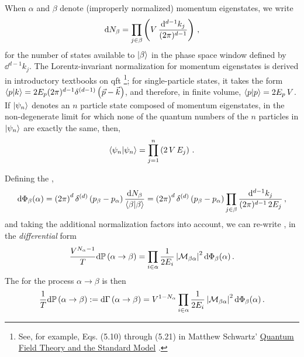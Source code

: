 When \(\alpha\) and \(\beta\) denote (improperly normalized) momentum eigenstates, we write
\begin{align}
    \dd N_\beta = \prod_{j \in \beta}\left(V \, \frac{\dd^{d-1} k_j}{(2\pi)^{d-1}}\right)
    \,,
\end{align}
for the number of states available to \(\ket{\beta}\) in the phase space window defined by \(\dd^{d-1} k_j\).
%
The Lorentz-invariant normalization for momentum eigenstates is derived in introductory textbooks on \gls{qft}%
\footnote{
    See, for example, Eqs. (5.10) through (5.21) in Matthew Schwartz' \underline{Quantum Field Theory and the Standard Model} \cite{Schwartz:2014sze}.
};
%
for single-particle states, it takes the form \(\braket{p}{k} = 2 E_p (2\pi)^{d-1} \delta^{(d-1)}\left(\vec{p} - \vec{k}\right)\), and therefore, in finite volume, \(\braket{p}{p} = 2 E_p \, V\).
%
If \(\ket{\psi_n}\) denotes an \(n\) particle state composed of momentum eigenstates, in the non-degenerate limit for which none of the quantum numbers of the \(n\) particles in \(\ket{\psi_n}\) are exactly the same, then,
\begin{align}
    \braket{\psi_n}{\psi_n}
    =
    \prod_{j = 1}^n \left(2 \, V\, E_j\right)
    \,.
\end{align}

Defining the ,
\begin{align}
   \dd\Phi_\beta(\alpha)
   =
   \left(2\pi\right)^d \delta^{(d)}\left(p_\beta - p_\alpha\right)
   \frac{\dd N_\beta}{\braket{\beta}{\beta}}
   =
   \left(2\pi\right)^d \delta^{(d)}\left(p_\beta - p_\alpha\right)
   \prod_{j \in \beta}
    \frac{\dd^{d-1} k_j}{(2\pi)^{d-1}\, 2 E_j}
   \,,
\end{align}
and taking the additional normalization factors into account, we can re-write , in the \textit{differential} form
\begin{align}
    \frac{V^{N_\alpha - 1}}{T}
    \dd \mathbb{P}\left(\alpha \to \beta\right)
    =
    \prod_{i \in \alpha} \frac{1}{2 E_i}
    \,
    \abs{\mathcal{M}_{\beta\alpha}}^2
    \,
    \dd \Phi_\beta(\alpha)
    \,.
\end{align}
The  for the process \(\alpha \to \beta\) is then
\begin{align}
    \label{eq:differential-rate}
    \frac{1}{T}
    \dd \mathbb{P}\le(\alpha \to \beta\ri)
    :=
    \dd \Gamma\le(\alpha \to \beta\ri)
    =
    V^{1 - N_{\alpha}}
    \prod_{i \in \alpha} \frac{1}{2 E_i}
    \,
    \abs{\mathcal{M}_{\beta\alpha}}^2
    \,
    \dd \Phi_\beta(\alpha)
    \,.
\end{align}


